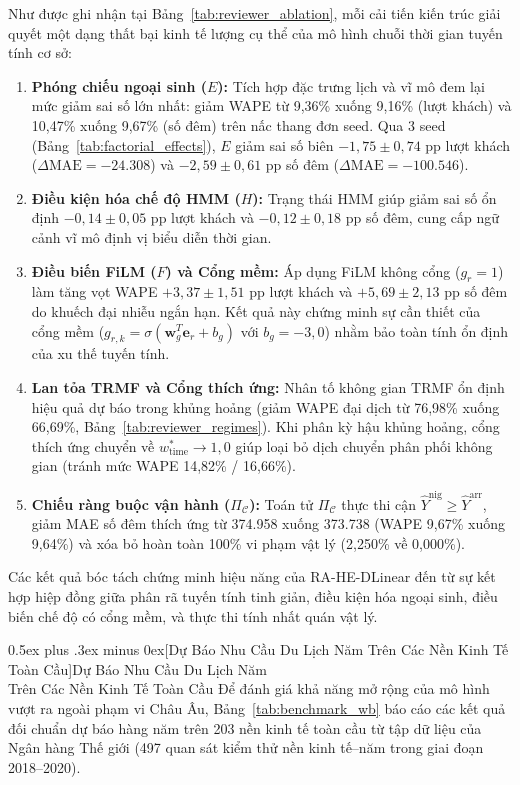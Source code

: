 \documentclass[10pt,journal,compsoc]{IEEEtran}
\makeatletter
\def\subsection{\@startsection{subsection}{2}{\z@}{-1.8ex plus -0.6ex minus -0.3ex}%
{0.5ex plus .3ex minus 0ex}{\normalfont\normalsize\rmfamily\bfseries}}
\makeatother
\begin{document}
Như được ghi nhận tại Bảng~\ref{tab:reviewer_ablation}, mỗi cải tiến kiến trúc giải quyết một dạng thất bại kinh tế lượng cụ thể của mô hình chuỗi thời gian tuyến tính cơ sở:
\begin{enumerate}\setlength{\itemsep}{1pt}\setlength{\parskip}{0pt}\setlength{\parsep}{0pt}
    \item \textbf{Phóng chiếu ngoại sinh ($E$):} Tích hợp đặc trưng lịch và vĩ mô đem lại mức giảm sai số lớn nhất: giảm WAPE từ 9,36\% xuống 9,16\% (lượt khách) và 10,47\% xuống 9,67\% (số đêm) trên nấc thang đơn seed. Qua 3 seed (Bảng~\ref{tab:factorial_effects}), $E$ giảm sai số biên $-1{,}75\pm0{,}74$ pp lượt khách ($\Delta\text{MAE} = -24.308$) và $-2{,}59\pm0{,}61$ pp số đêm ($\Delta\text{MAE} = -100.546$).
    \item \textbf{Điều kiện hóa chế độ HMM ($H$):} Trạng thái HMM giúp giảm sai số ổn định $-0{,}14\pm0{,}05$ pp lượt khách và $-0{,}12\pm0{,}18$ pp số đêm, cung cấp ngữ cảnh vĩ mô định vị biểu diễn thời gian.
    \item \textbf{Điều biến FiLM ($F$) và Cổng mềm:} Áp dụng FiLM không cổng ($g_r=1$) làm tăng vọt WAPE $+3{,}37\pm1{,}51$ pp lượt khách và $+5{,}69\pm2{,}13$ pp số đêm do khuếch đại nhiễu ngắn hạn. Kết quả này chứng minh sự cần thiết của cổng mềm ($g_{r,k}=\sigma(\mathbf{w}_g^T\mathbf{e}_r+b_g)$ với $b_g=-3{,}0$) nhằm bảo toàn tính ổn định của xu thế tuyến tính.
    \item \textbf{Lan tỏa TRMF và Cổng thích ứng:} Nhân tố không gian TRMF ổn định hiệu quả dự báo trong khủng hoảng (giảm WAPE đại dịch từ 76,98\% xuống 66,69\%, Bảng~\ref{tab:reviewer_regimes}). Khi phân kỳ hậu khủng hoảng, cổng thích ứng chuyển về $w_{\text{time}}^* \to 1{,}0$ giúp loại bỏ dịch chuyển phân phối không gian (tránh mức WAPE 14,82\% / 16,66\%).
    \item \textbf{Chiếu ràng buộc vận hành ($\Pi_{\mathcal{C}}$):} Toán tử $\Pi_{\mathcal{C}}$ thực thi cận $\hat{Y}^{\mathrm{nig}} \ge \hat{Y}^{\mathrm{arr}}$, giảm MAE số đêm thích ứng từ 374.958 xuống 373.738 (WAPE 9,67\% xuống 9,64\%) và xóa bỏ hoàn toàn 100\% vi phạm vật lý (2,250\% về 0,000\%).
\end{enumerate}
Các kết quả bóc tách chứng minh hiệu năng của RA-HE-DLinear đến từ sự kết hợp hiệp đồng giữa phân rã tuyến tính tinh giản, điều kiện hóa ngoại sinh, điều biến chế độ có cổng mềm, và thực thi tính nhất quán vật lý.

\subsection[Dự Báo Nhu Cầu Du Lịch Năm Trên Các Nền Kinh Tế Toàn Cầu]{Dự Báo Nhu Cầu Du Lịch Năm\\Trên Các Nền Kinh Tế Toàn Cầu}
\label{sec:benchmark_wb}
Để đánh giá khả năng mở rộng của mô hình vượt ra ngoài phạm vi Châu Âu, Bảng~\ref{tab:benchmark_wb} báo cáo các kết quả đối chuẩn dự báo hàng năm trên 203 nền kinh tế toàn cầu từ tập dữ liệu của Ngân hàng Thế giới (497 quan sát kiểm thử nền kinh tế--năm trong giai đoạn 2018--2020).
\end{document}
